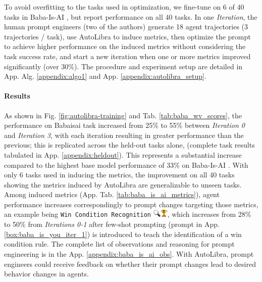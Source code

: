 

To avoid overfitting to the tasks used in optimization, we fine-tune on 6 of 40 tasks in Baba-Is-AI \citep{paglieri2024balrog}, but report performance on all 40 tasks. 
In one \textit{Iteration}, the human prompt engineers (two of the authors) generate 18 agent trajectories (3 trajectories / task), use AutoLibra to induce metrics, then optimize the prompt to achieve higher performance on the induced metrics without considering the task success rate, and start a new iteration when one or more metrics improved significantly (over 30\%). The procedure and experiment setup are detailed in App. Alg. \ref{appendix:algo1} and App. \ref{appendix:autolibra_setup}.
\vspace{-0.4cm}

\paragraph{Results}
As shown in Fig. \ref{fig:autolibra-training} and Tab. \ref{tab:baba_wv_scores}, the performance on Babaisai task increased from 25\% to 55\% between \textit{Iteration 0} and \textit{Iteration 3}, with each iteration resulting in greater performance than the previous; this is replicated across the held-out tasks alone, (complete task results tabulated in App. \ref{appendix:heldout}). This represents a substantial increase compared to the highest base model performance of 33\% on Baba-Is-AI \citep{paglieri2024balrog}. With only 6 tasks used in inducing the metrics, the improvement on all 40 tasks showing the metrics induced by AutoLibra are generalizable to unseen tasks. Among induced metrics (App. Tab. \ref{tab:baba_is_ai_metrics}), agent performance increases correspondingly to prompt changes targeting those metrics, an example being \texttt{Win Condition Recognition} \includegraphics[height=1em]{figs/emojis/emoji_1.png}, which increases from 28\% to 50\% from \textit{Iterations 0-1} after few-shot prompting (prompt in App. \ref{box:baba_is_you_iter_1}) is introduced to teach the identification of a win condition rule. The complete list of observations and reasoning for prompt engineering is in the App. \ref{appendix:baba_is_ai_obs}. With AutoLibra, prompt engineers could receive feedback on whether their prompt changes lead to desired behavior changes in agents. 


